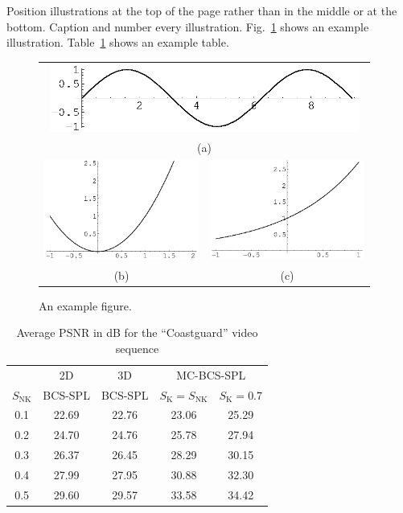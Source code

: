 \documentclass[smallabstract,smallcaptions]{dccpaper}
\begin{document}
Position illustrations at the top of the page rather than in the middle
or at the bottom. Caption and number every illustration.
Fig.~\ref{fig:example} shows an example illustration.
Table~\ref{tab:example} shows an example table.


\begin{figure}[t]
\begin{center}
\begin{tabular}{cc}
\multicolumn{2}{c}{\includegraphics[width=4in]{image1}} \\
\multicolumn{2}{c}{\small{(a)}} \\[1em]
\includegraphics[width=2in]{image3} &
\includegraphics[width=2in]{image4} \\
{\small (b)} & {\small (c)}
\end{tabular}
\end{center}
\caption{\label{fig:example}%
An example figure.}
\end{figure}

\begin{table}[tp]
\begin{center}
\caption{\label{tab:example}%
Average PSNR in dB for the ``Coastguard'' video sequence}
{
\renewcommand{\baselinestretch}{1}\footnotesize
\begin{tabular}{|c|c|c|c|c|}
\cline{2-5}
\multicolumn{1}{c|}{~}&
\multicolumn{1}{c|}{2D} &
\multicolumn{1}{c|}{3D} &
\multicolumn{2}{c|}{MC-BCS-SPL}\\
\cline{4-5}
\multicolumn{1}{c|}{$S_{\text{NK}}$} &
BCS-SPL & BCS-SPL & $S_{\text{K}}=S_{\text{NK}}$ & $S_{\text{K}}=0.7$\\
\hline
0.1 &22.69 &22.76 &23.06 &25.29 \\
0.2 &24.70 &24.76 &25.78 &27.94 \\
0.3 &26.37 &26.45 &28.29 &30.15 \\
0.4 &27.99 &27.95 &30.88 &32.30 \\
0.5 &29.60 &29.57 &33.58 &34.42 \\
\hline
\end{tabular}}
\end{center}
\end{table}
\end{document}
